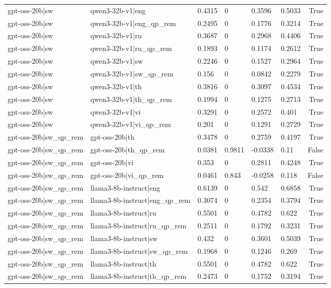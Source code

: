 \begin{table}
\begin{tabular}{llllllr}
gpt-oss-20b|sw & qwen3-32b-v1|eng & 0.4315 & 0 & 0.3596 & 0.5033 & True \\
gpt-oss-20b|sw & qwen3-32b-v1|eng_qp_rem & 0.2495 & 0 & 0.1776 & 0.3214 & True \\
gpt-oss-20b|sw & qwen3-32b-v1|ru & 0.3687 & 0 & 0.2968 & 0.4406 & True \\
gpt-oss-20b|sw & qwen3-32b-v1|ru_qp_rem & 0.1893 & 0 & 0.1174 & 0.2612 & True \\
gpt-oss-20b|sw & qwen3-32b-v1|sw & 0.2246 & 0 & 0.1527 & 0.2964 & True \\
gpt-oss-20b|sw & qwen3-32b-v1|sw_qp_rem & 0.156 & 0 & 0.0842 & 0.2279 & True \\
gpt-oss-20b|sw & qwen3-32b-v1|th & 0.3816 & 0 & 0.3097 & 0.4534 & True \\
gpt-oss-20b|sw & qwen3-32b-v1|th_qp_rem & 0.1994 & 0 & 0.1275 & 0.2713 & True \\
gpt-oss-20b|sw & qwen3-32b-v1|vi & 0.3291 & 0 & 0.2572 & 0.401 & True \\
gpt-oss-20b|sw & qwen3-32b-v1|vi_qp_rem & 0.201 & 0 & 0.1291 & 0.2729 & True \\
gpt-oss-20b|sw_qp_rem & gpt-oss-20b|th & 0.3478 & 0 & 0.2759 & 0.4197 & True \\
gpt-oss-20b|sw_qp_rem & gpt-oss-20b|th_qp_rem & 0.0381 & 0.9811 & -0.0338 & 0.11 & False \\
gpt-oss-20b|sw_qp_rem & gpt-oss-20b|vi & 0.353 & 0 & 0.2811 & 0.4248 & True \\
gpt-oss-20b|sw_qp_rem & gpt-oss-20b|vi_qp_rem & 0.0461 & 0.843 & -0.0258 & 0.118 & False \\
gpt-oss-20b|sw_qp_rem & llama3-8b-instruct|eng & 0.6139 & 0 & 0.542 & 0.6858 & True \\
gpt-oss-20b|sw_qp_rem & llama3-8b-instruct|eng_qp_rem & 0.3074 & 0 & 0.2354 & 0.3794 & True \\
gpt-oss-20b|sw_qp_rem & llama3-8b-instruct|ru & 0.5501 & 0 & 0.4782 & 0.622 & True \\
gpt-oss-20b|sw_qp_rem & llama3-8b-instruct|ru_qp_rem & 0.2511 & 0 & 0.1792 & 0.3231 & True \\
gpt-oss-20b|sw_qp_rem & llama3-8b-instruct|sw & 0.432 & 0 & 0.3601 & 0.5039 & True \\
gpt-oss-20b|sw_qp_rem & llama3-8b-instruct|sw_qp_rem & 0.1968 & 0 & 0.1246 & 0.269 & True \\
gpt-oss-20b|sw_qp_rem & llama3-8b-instruct|th & 0.5501 & 0 & 0.4782 & 0.622 & True \\
gpt-oss-20b|sw_qp_rem & llama3-8b-instruct|th_qp_rem & 0.2473 & 0 & 0.1752 & 0.3194 & True \\

\end{tabular}
\end{table}
